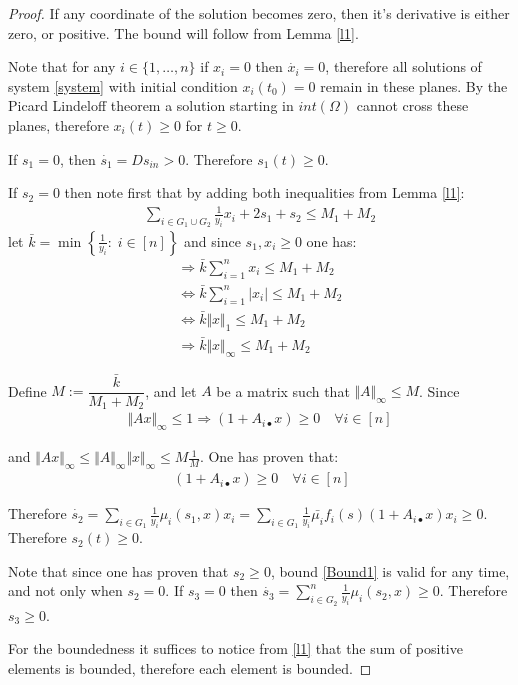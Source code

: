 \documentclass[3p,times]{article}
\begin{document}
\wellposedness*

\begin{proof}
	If any coordinate of the solution becomes zero, then it's derivative is either zero, or positive. The bound will follow from Lemma \ref{l1}.
	
	Note that for any $i \in \{1,\dots, n\} $ if $x_i = 0$ then $\dot{x_{i}} = 0$, therefore all solutions of system \eqref{system} with initial condition $x_i(t_0) = 0$ remain in these planes. By the Picard Lindeloff theorem a solution starting in $int(\Omega)$ cannot cross these planes, therefore $x_i(t)\geq 0$ for $t \geq 0$.
	
	If $s_1 = 0$, then $\dot{s_1} = Ds_{in} > 0$. Therefore $s_1(t) \geq 0$.
	
	If $s_2 = 0$ then note first that by adding both inequalities from Lemma \eqref{l1}:
	\begin{align*}
	\sum \limits_{i \in G_1 \cup G_2}  \frac{1}{y_i} x_i + 2s_1 + s_2 \leq M_1 + M_2 
	\end{align*}
	let $\bar{k} = \min \left\{ \frac{1}{y_i}  : \; i\in [n] \right \}$ and since $s_1,x_i \geq 0$ one has:
	\begin{align*}
	\Rightarrow \bar{k} \sum  \limits_{i = 1}^{n}   x_i  \leq M_1 + M_2  \\
	\Leftrightarrow \bar{k} \sum  \limits_{i = 1}^{n}   \vert x_i \vert  \leq M_1 + M_2  \\
	\Leftrightarrow \bar{k} \Vert x \Vert_1  \leq M_1 + M_2  \\
	\Rightarrow   \bar{k} \Vert x \Vert_{\infty} \leq M_1 + M_2
	\end{align*}
	
	
	Define $M := \dfrac{\bar{k}}{M_1 + M_2}$, and let $A$ be a matrix such that $\Vert A \Vert_{\infty} \leq M$. Since
	\begin{align*} \Vert Ax \Vert_{\infty} \leq 1 \Rightarrow   (1 + A_{i\bullet}x) \geq 0 \quad \forall i \in [n]
	\end{align*}
	
	and $\Vert Ax \Vert_{\infty} \leq \Vert A \Vert_{\infty} \Vert x\Vert_{\infty} \leq M \frac{1}{M}$. One has proven that:
	\begin{align}
	\label{Bound1}  \;   (1 + A_{i\bullet}x) \geq 0  \quad \forall i \in [n]
	\end{align} 
	
	Therefore $\dot{s_2} = \displaystyle \sum \limits_{i \in G_1 } \frac{1}{y_i}\mu_i(s_1,x)x_i =  \sum \limits_{i \in G_1 } \frac{1}{y_i}\bar{\mu_i}f_i(s)(1+A_{i \bullet }x)x_i \geq 0$. Therefore $s_2(t) \geq 0$.
	
	Note that since one has proven that $s_2 \geq 0$, bound \eqref{Bound1} is valid for any time, and not only when $s_2 = 0$. 
	If $s_3 = 0$ then $\dot{s_3} = \sum \limits_{i \in G_2 }^{n}\frac{1}{y_i}\mu_i(s_2,x)\geq 0$. Therefore $s_3 \geq 0$.
	
	For the boundedness it suffices to notice from \cref{l1} that the sum of positive elements is bounded, therefore each element is bounded.
\end{proof}
\end{document}
